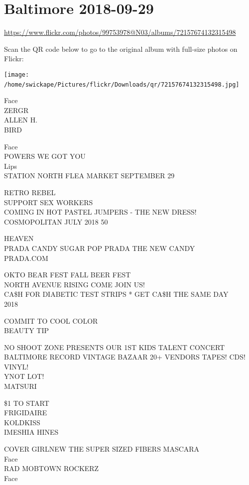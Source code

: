 \documentclass[10pt,letterpaper]{article}
\begin{document}
\section*{Baltimore 2018-09-29}

\url{https://www.flickr.com/photos/99753978@N03/albums/72157674132315498}

Scan the QR code below to go to the original album with full-size photos on Flickr:

\texttt{[image: /home/swickape/Pictures/flickr/Downloads/qr/72157674132315498.jpg]}
\

Face\\
ZERGR\\
ALLEN H.\\
BIRD

Face\\
POWERS WE GOT YOU\\
Lips\\
STATION NORTH FLEA MARKET SEPTEMBER 29

RETRO REBEL\\
SUPPORT SEX WORKERS\\
COMING IN HOT PASTEL JUMPERS {-} THE NEW DRESS!\\
COSMOPOLITAN JULY 2018 50

HEAVEN\\
PRADA CANDY SUGAR POP PRADA THE NEW CANDY\\
PRADA.COM

OKTO BEAR FEST FALL BEER FEST\\
NORTH AVENUE RISING COME JOIN US!\\
CA\$H FOR DIABETIC TEST STRIPS * GET CA\$H THE SAME DAY\\
2018

COMMIT TO COOL COLOR\\
BEAUTY TIP

NO SHOOT ZONE PRESENTS OUR 1ST KIDS TALENT CONCERT\\
BALTIMORE RECORD VINTAGE BAZAAR 20+ VENDORS TAPES!  CDS!  VINYL!\\
YNOT LOT!\\
MATSURI

\$1 TO START\\
FRIGIDAIRE\\
KOLDKISS\\
IMESHIA HINES

COVER GIRLNEW THE SUPER SIZED FIBERS MASCARA\\
Face\\
RAD MOBTOWN ROCKERZ\\
Face
\end{document}
